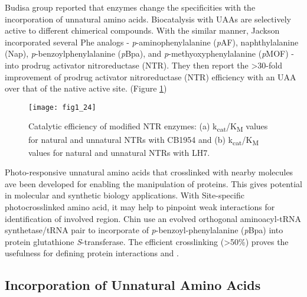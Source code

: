 \begin{refsection}
Budisa group reported that enzymes change the specificities with the
incorporation of unnatural amino acids\cite{Budisa2006}. Biocatalysis with UAAs
are selectively active to different chimerical compounds. With the similar
manner, Jackson  incorporated several Phe analogs -
\emph{p}-aminophenylalanine (\emph{p}AF), naphthylalanine (Nap),
\emph{p}-benzoylphenylalanine (\emph{p}Bpa), and \emph{p}-methyoxyphenylalanine
(\emph{p}MOF) - into prodrug activator nitroreductase (NTR). They then report
the >30-fold improvement of prodrug activator nitroreductase (NTR) efficiency
with an UAA over that of the native active site\cite{Jackson2006a}. (Figure
\ref{fig:selectivity-example})
\begin{figure}[h!] \centering \texttt{[image: fig1\_24]}
    \caption[Catalytic efficiency of modified NTR enzymes: (a)
        k\textsubscript{cat}/K\textsubscript{M} values for natural and
        unnatural NTRs with CB1954 and (b)
        k\textsubscript{cat}/K\textsubscript{M} values for natural and
    unnatural NTRs with LH7.]{Catalytic efficiency of modified NTR enzymes: (a)
        k\textsubscript{cat}/K\textsubscript{M} values for natural and
        unnatural NTRs with CB1954 and (b)
        k\textsubscript{cat}/K\textsubscript{M} values for natural and
        unnatural NTRs with LH7\cite{Jackson2006a}.}
    \label{fig:selectivity-example} 
\end{figure}

Photo-responsive unnatural amino acids that crosslinked with nearby
molecules ave been developed for enabling the  manipulation of
proteins. This gives potential in molecular and synthetic biology applications.
With Site-specific photocrosslinked amino acid, it may help to pinpoint weak
interactions for identification of involved region. Chin  use an
evolved orthogonal aminoacyl-tRNA synthetase/tRNA pair to incorporate of
\emph{p}-benzoyl-phenylalanine (\emph{p}Bpa) into protein glutathione
\emph{S}-transferase\cite{Chin2002}. The efficient crosslinking (>50\%) proves
the usefulness for defining protein interactions  and .
\clearpage

\subsection{Incorporation of Unnatural Amino Acids} 
\label{sec:rsi-intro}


\end{refsection}
